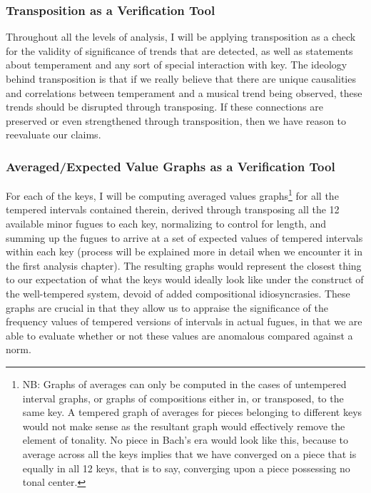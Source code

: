 \subsubsection{Transposition as a Verification
Tool}\label{transposition-as-a-verification-tool}

Throughout all the levels of analysis, I will be applying transposition
as a check for the validity of significance of trends that are detected,
as well as statements about temperament and any sort of special
interaction with key. The ideology behind transposition is that if we
really believe that there are unique causalities and correlations
between temperament and a musical trend being observed, these trends
should be disrupted through transposing. If these connections are
preserved or even strengthened through transposition, then we have
reason to reevaluate our claims.

\subsubsection{Averaged/Expected Value Graphs as a Verification
Tool}\label{averagedexpected-value-graphs-as-a-verification-tool}

For each of the keys, I will be computing averaged values
graphs\footnote{NB: Graphs of averages can only be computed in the cases of untempered interval graphs, or graphs of compositions either in, or transposed, to the same key. A tempered graph of averages for pieces belonging to different keys would not make sense as the resultant graph would effectively remove the element of tonality. No piece in Bach's era would look like this, because to average across all the keys implies that we have converged on a piece that is equally in all 12 keys, that is to say, converging upon a piece possessing no tonal center.}
for all the tempered intervals contained therein, derived through
transposing all the 12 available minor fugues to each key, normalizing
to control for length, and summing up the fugues to arrive at a set of
expected values of tempered intervals within each key (process will be
explained more in detail when we encounter it in the first analysis
chapter). The resulting graphs would represent the closest thing to our
expectation of what the keys would ideally look like under the construct
of the well-tempered system, devoid of added compositional
idiosyncrasies. These graphs are crucial in that they allow us to
appraise the significance of the frequency values of tempered versions
of intervals in actual fugues, in that we are able to evaluate whether
or not these values are anomalous compared against a norm.

